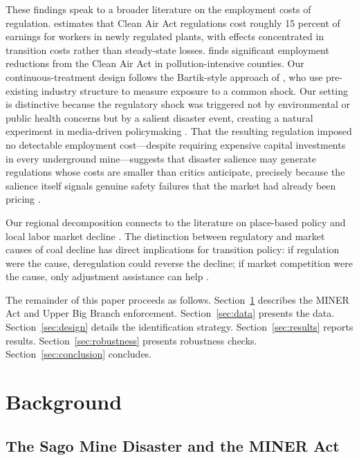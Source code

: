 \documentclass[12pt]{article}
\begin{document}
These findings speak to a broader literature on the employment costs of regulation. \citet{walker2013transitional} estimates that Clean Air Act regulations cost roughly 15 percent of earnings for workers in newly regulated plants, with effects concentrated in transition costs rather than steady-state losses. \citet{greenstone2012does} finds significant employment reductions from the Clean Air Act in pollution-intensive counties. Our continuous-treatment design follows the Bartik-style approach of \citet{autor2013china}, who use pre-existing industry structure to measure exposure to a common shock. Our setting is distinctive because the regulatory shock was triggered not by environmental or public health concerns but by a salient disaster event, creating a natural experiment in media-driven policymaking \citep{eisensee2007news}. That the resulting regulation imposed no detectable employment cost---despite requiring expensive capital investments in every underground mine---suggests that disaster salience may generate regulations whose costs are smaller than critics anticipate, precisely because the salience itself signals genuine safety failures that the market had already been pricing \citep{boeri2021survival}.

Our regional decomposition connects to the literature on place-based policy and local labor market decline \citep{kline2019people}. The distinction between regulatory and market causes of coal decline has direct implications for transition policy: if regulation were the cause, deregulation could reverse the decline; if market competition were the cause, only adjustment assistance can help \citep{bartik1991benefits}.

The remainder of this paper proceeds as follows. Section~\ref{sec:background} describes the MINER Act and Upper Big Branch enforcement. Section~\ref{sec:data} presents the data. Section~\ref{sec:design} details the identification strategy. Section~\ref{sec:results} reports results. Section~\ref{sec:robustness} presents robustness checks. Section~\ref{sec:conclusion} concludes.


\section{Background}
\label{sec:background}

\subsection{The Sago Mine Disaster and the MINER Act}
\end{document}
